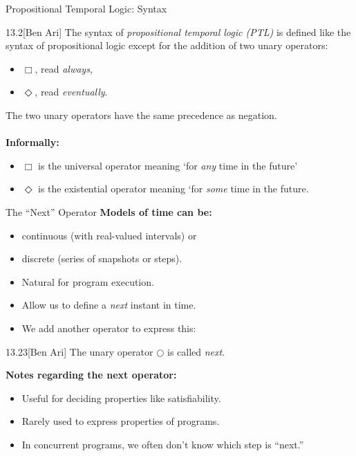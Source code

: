 \begin{slide}[bm=,toc=]{Propositional Temporal Logic: Syntax}
\begin{defn}{13.2}[Ben Ari]
The syntax of \emph{propositional temporal logic (PTL)} is defined like
the syntax of propositional logic except for the addition of two unary
operators:
\end{defn}
\vspace{-2ex}
\begin{itemize}
\item<2-> $\Box$, read \emph{always},
\item<3-> $\Diamond$, read \emph{eventually}.
\end{itemize}
\pause[3]
The two unary operators have the same precedence as negation.\\~\\
\pause
{\bf Informally:}
\begin{itemize}
\item $\Box$ is the universal operator meaning `for \emph{any} time in the
future'
\item $\Diamond$ is the existential operator meaning `for \emph{some} time in
the future.
\end{itemize}
\end{slide}

\begin{wideslide}[bm=,toc=]{The ``Next'' Operator}
{\bf Models of time can be:}
\begin{itemize}
\item<2-> continuous (with real-valued intervals) or
\item<3-> discrete (series of snapshots or steps).
\end{itemize}
\begin{itemize}
\item Natural for program execution.
\item Allow us to define a \emph{next} instant in time.
\item We add another operator to express this:
\end{itemize}
\pause
\begin{defn}{13.23}[Ben Ari]
The unary operator $\Circle$ is called \emph{next}.
\end{defn}
\pause
{\bf Notes regarding the next operator:}
\begin{itemize}
\item Useful for deciding properties like satisfiability.
\item Rarely used to express properties of programs.
\item In concurrent programs, we often don't know which step is ``next.''
\end{itemize}
\end{wideslide}
